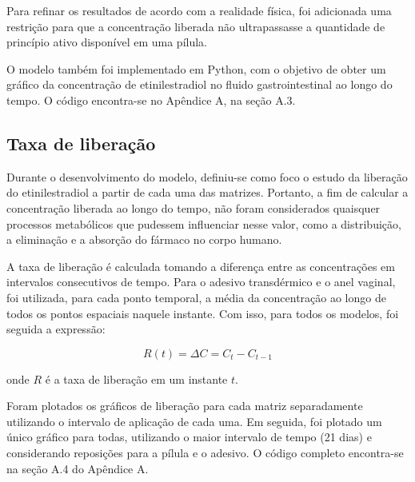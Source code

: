 Para refinar os resultados de acordo com a realidade física, foi adicionada uma restrição para que a concentração liberada não ultrapassasse a quantidade de princípio ativo disponível em uma pílula. 

O modelo também foi implementado em Python, com o objetivo de obter um gráfico da concentração de etinilestradiol no fluido gastrointestinal ao longo do tempo. O código encontra-se no Apêndice A, na seção A.3.

\subsection{Taxa de liberação}

Durante o desenvolvimento do modelo, definiu-se como foco o estudo da liberação do etinilestradiol a partir de cada uma das matrizes. Portanto, a fim de calcular a concentração liberada ao longo do tempo, não foram considerados quaisquer processos metabólicos que pudessem influenciar nesse valor, como a distribuição, a eliminação e a absorção do fármaco no corpo humano.

 A taxa de liberação é calculada tomando a diferença entre as concentrações em intervalos consecutivos de tempo. Para o adesivo transdérmico e o anel vaginal, foi utilizada, para cada ponto temporal, a média da concentração ao longo de todos os pontos espaciais naquele instante. Com isso, para todos os modelos, foi seguida a expressão:

\begin{equation}
    R(t) = \Delta C = C_t - C_{t-1}
\end{equation}

\noindent onde $R$ é a taxa de liberação em um instante $t$.

Foram plotados os gráficos de liberação para cada matriz separadamente utilizando o intervalo de aplicação de cada uma. Em seguida, foi plotado um único gráfico para todas, utilizando o maior intervalo de tempo (21 dias) e considerando reposições para a pílula e o adesivo. O código completo encontra-se na seção A.4 do Apêndice A.